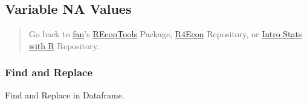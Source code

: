 \documentclass[
]{book}
\begin{document}
\begin{table}[!h]
\centering
{}
\end{table}

\hypertarget{variable-na-values}{%
\subsection{Variable NA Values}\label{variable-na-values}}

\begin{quote}
Go back to \href{http://fanwangecon.github.io/CodeDynaAsset/}{fan}'s \href{https://fanwangecon.github.io/REconTools/}{REconTools} Package, \href{https://fanwangecon.github.io/R4Econ/}{R4Econ} Repository, or \href{https://fanwangecon.github.io/Stat4Econ/}{Intro Stats with R} Repository.
\end{quote}

\hypertarget{find-and-replace}{%
\subsubsection{Find and Replace}\label{find-and-replace}}

Find and Replace in Dataframe.
\end{document}

